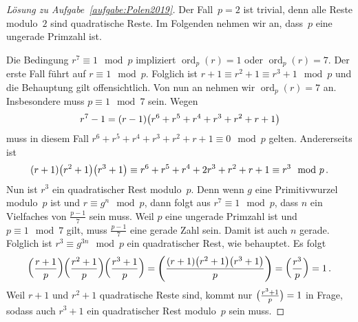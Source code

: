 \begin{proof}[Lösung zu Aufgabe~\ref{aufgabe:Polen2019}]
	Der Fall~$p=2$ ist trivial, denn alle Reste modulo~$2$ sind quadratische Reste. Im Folgenden nehmen wir an, dass~$p$ eine ungerade Primzahl ist.
	
	Die Bedingung $r^7\equiv 1\mod p$ impliziert $\operatorname{ord}_p(r)=1$ oder $\operatorname{ord}_p(r)=7$. Der erste Fall führt auf $r\equiv 1\mod p$. Folglich ist $r+1\equiv r^2+1\equiv r^3+1\mod p$ und die Behauptung gilt offensichtlich. Von nun an nehmen wir $\operatorname{ord}_p(r)=7$ an. Insbesondere muss $p\equiv 1\mod 7$ sein. Wegen
	\begin{equation*}
		r^7-1= (r-1)\parens*{r^6+r^5+r^4+r^3+r^2+r+1}
	\end{equation*}
	muss in diesem Fall $r^6+r^5+r^4+r^3+r^2+r+1\equiv 0\mod p$ gelten. Andererseits ist
	\begin{equation*}
		(r+1)\parens*{r^2+1}\parens*{r^3+1}\equiv r^6+r^5+r^4+2r^3+r^2+r+1\equiv r^3\mod p\,.
	\end{equation*}
	Nun ist $r^3$ ein quadratischer Rest modulo~$p$. Denn wenn $g$ eine Primitivwurzel modulo~$p$ ist und $r\equiv g^n\mod p$, dann folgt aus $r^7\equiv1\mod p$, dass $n$ ein Vielfaches von $\frac{p-1}{7}$ sein muss. Weil $p$ eine ungerade Primzahl ist und $p\equiv 1\mod 7$ gilt, muss $\frac{p-1}{7}$ eine gerade Zahl sein. Damit ist auch $n$ gerade. Folglich ist $r^3\equiv g^{3n}\mod p$ ein quadratischer Rest, wie behauptet. Es folgt
	\begin{equation*}
		\parens*{\frac{r+1}{p}}\parens*{\frac{r^2+1}{p}}\parens*{\frac{r^3+1}{p}}=\parens*{\frac{(r+1)\parens*{r^2+1}\parens*{r^3+1}}{p}}=\parens*{\frac{r^3}{p}}=1\,.
	\end{equation*}
	Weil $r+1$ und $r^2+1$ quadratische Reste sind, kommt nur $\parens[\big]{\frac{r^3+1}{p}}=1$ in Frage, sodass auch $r^3+1$ ein quadratischer Rest modulo~$p$ sein muss.
\end{proof}